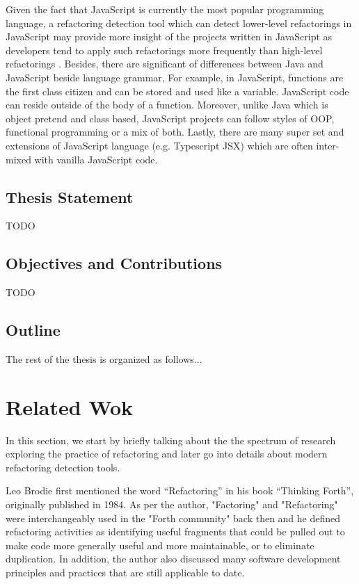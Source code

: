 \documentclass[letterpaper,12pt,onecolumn,final]{report}
\begin{document}
Given the fact that JavaScript is currently the most popular programming language, a refactoring detection tool which can detect lower-level refactorings in JavaScript may provide more insight of the projects written in JavaScript as developers tend to apply such refactorings more frequently than high-level refactorings \cite{MurphyHill2012}. Besides, there are significant of differences between Java and JavaScript beside language grammar, For example, in JavaScript,  functions are the first class citizen and can be stored and used like a variable. JavaScript code can reside outside of the body of a function. Moreover, unlike Java which is object pretend and class based, JavaScript projects can follow styles of OOP, functional programming or a mix of both. Lastly, there are many  super set and extensions of JavaScript language (e.g. Typescript JSX) which are often inter-mixed with vanilla JavaScript code.


\section{Thesis Statement}
TODO

\section{Objectives and Contributions}
TODO

\section{Outline}
The rest of the thesis is organized as follows...


\chapter{Related Wok}
\label{chap:background}

In this section, we start by briefly talking about the the spectrum of research exploring the practice of refactoring and later go into details about modern refactoring detection tools.

Leo Brodie \cite{thinkingforth} first mentioned the word “Refactoring” in his book “Thinking Forth”, originally published in 1984. As per the author, "Factoring" and "Refactoring" were interchangeably used in the "Forth community" back then and he defined refactoring activities as identifying useful fragments that could be pulled out to make code more generally useful and more maintainable, or to eliminate duplication. In addition, the author also discussed many software development principles and practices that are still applicable to date.
\end{document}
